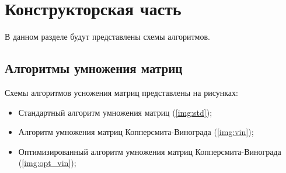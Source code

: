 \chapter{Конструкторская часть}

В данном разделе будут представлены схемы алгоритмов.

\section{Алгоритмы умножения матриц}

Схемы алгоритмов усножения матриц представлены на рисунках:

\begin{itemize}
	\item Стандартный алгоритм умножения матриц (\ref{img:std});
	\item Алгоритм умножения матриц Копперсмита-Винограда (\ref{img:vin});
	\item Оптимизированный алгоритм умножения матриц Копперсмита-Винограда (\ref{img:opt_vin});
\end{itemize}

